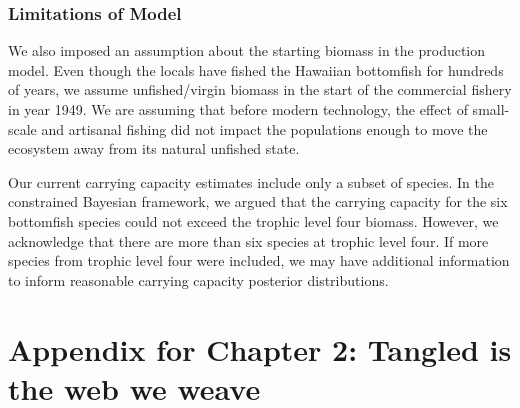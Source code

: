 \documentclass[oneside,12pt,final]{sty/ucthesis-CA2012}
\begin{document}
\begin{mainmatter}
\subsection{Limitations of Model}
We also imposed an assumption about the starting biomass in the production model. Even though the locals have fished the Hawaiian bottomfish for hundreds of years, we assume unfished/virgin biomass in the start of the commercial fishery in year 1949. We are assuming that before modern technology, the effect of small-scale and artisanal fishing did not impact the populations enough to move the ecosystem away from its natural unfished state. 

\vspace{5mm}

Our current carrying capacity estimates include only a subset of species. In the constrained Bayesian framework, we argued that the carrying capacity for the six bottomfish species could not exceed the trophic level four biomass. However, we acknowledge that there are more than six species at trophic level four. If more species from trophic level four were included, we may have additional information to inform reasonable carrying capacity posterior distributions. 





\appendix

\dsp

\chapter{Appendix for Chapter 2: Tangled is the web we weave}{\label{appendix:a}}


\end{mainmatter}
\end{document}
